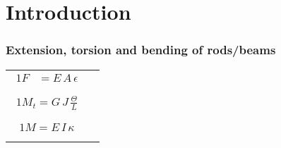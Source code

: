 \section*{Introduction}


\begin{frame}
  \frametitle{Extension, torsion and bending of rods/beams}
  
  \begin{tabularx}{\linewidth}{XX}
    {
    \begin{alignat*}{1}
      F &= E \, A \, \epsilon \\
    \end{alignat*}
    } & {
    \null
    } \\
    
    {
    \begin{alignat*}{1}
      M_t = G \, J \, \frac{\Theta}{L} \\
    \end{alignat*}
    } & {
    \null
    } \\
        
    {
    \begin{alignat*}{1}
      M = E \, I \, \kappa \\
    \end{alignat*}
    } & {
    \null
    }
  \end{tabularx}  
  
\end{frame}


